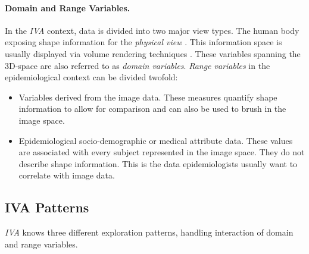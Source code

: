 \documentclass[journal]{style/vgtc} 			          %
\begin{document}
\paragraph{Domain and Range Variables. }
In the \emph{IVA} context, data is divided into two major view types.
%
The human body exposing shape information for the \emph{physical view} \cite{Oeltze2013}.
%
This information space is usually displayed via volume rendering techniques \cite{Oeltze2007}.
%
%
These variables spanning the 3D-space are also referred to as \emph{domain variables}.
%
\emph{Range variables} in the epidemiological context can be divided twofold:
%
\begin{itemize}
	\item Variables derived from the image data. 
	These measures quantify shape information to allow for comparison and can also be used to brush in the image space.
	\item Epidemiological socio-demographic or medical attribute data.
	These values are associated with every subject represented in the image space. 
	They do not describe shape information.
	This is the data epidemiologists usually want to correlate with image data.
\end{itemize}
%
% 

\subsection{IVA Patterns}
%
\emph{IVA} knows three different exploration patterns, handling interaction of domain and range variables.
\end{document}
